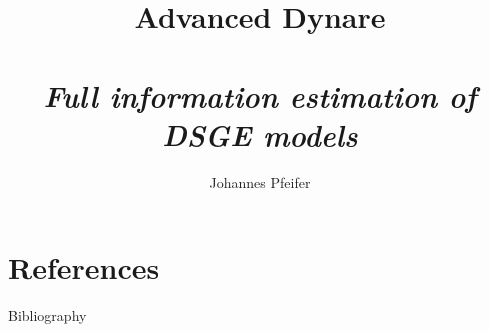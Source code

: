 \documentclass[handout,usepdftitle=false,xcolor=dvipsnames,aspectratio=169]{beamer}
\title[]{\textbf{Advanced Dynare\\}
\medskip{Chapter VI}\\
\emph{Full information estimation of DSGE models}
}
\author{Johannes Pfeifer}
\begin{document}
\maketitle



\part{References}
\begin{frame}[allowframebreaks]{Bibliography}
\printbibliography
\end{frame}
\end{document}
